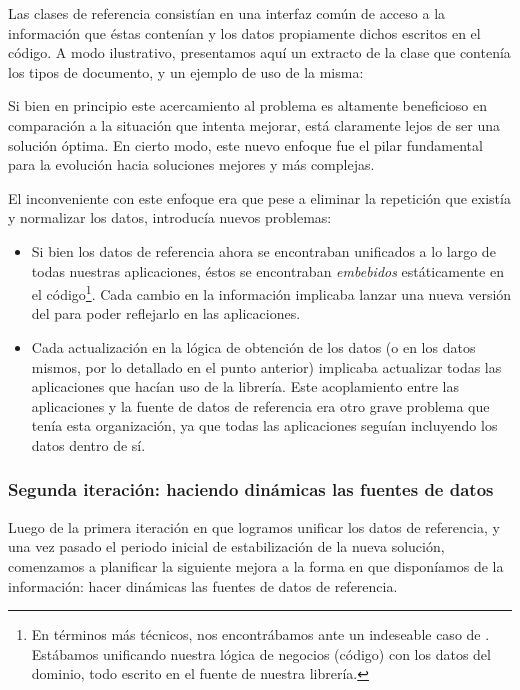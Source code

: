 Las clases de referencia consistían en una interfaz común de acceso a la información que éstas contenían y los datos propiamente dichos escritos en el código. A modo ilustrativo, presentamos aquí un extracto de la clase que contenía los tipos de documento, y un ejemplo de uso de la misma:


Si bien en principio este acercamiento al problema es altamente beneficioso en comparación a la situación que intenta mejorar, está claramente lejos de ser una solución óptima. En cierto modo, este nuevo enfoque fue el pilar fundamental para la evolución hacia soluciones mejores y más complejas.

El inconveniente con este enfoque era que pese a eliminar la repetición que existía y normalizar los datos, introducía nuevos problemas:

\begin{itemize}
  \item Si bien los datos de referencia ahora se encontraban unificados a lo largo de todas nuestras aplicaciones, éstos se encontraban \textit{embebidos} estáticamente en el código\footnote{En términos más técnicos, nos encontrábamos ante un indeseable caso de . Estábamos unificando nuestra lógica de negocios (código) con los datos del dominio, todo escrito en el fuente de nuestra librería.}. Cada cambio en la información implicaba lanzar una nueva versión del  para poder reflejarlo en las aplicaciones.

  \item Cada actualización en la lógica de obtención de los datos (o en los datos mismos, por lo detallado en el punto anterior) implicaba actualizar todas las aplicaciones que hacían uso de la librería. Este acoplamiento entre las aplicaciones y la fuente de datos de referencia era otro grave problema que tenía esta organización, ya que todas las aplicaciones seguían incluyendo los datos dentro de sí.
\end{itemize}


\subsubsection{Segunda iteración: haciendo dinámicas las fuentes de datos}
\label{nube:etapa2}

Luego de la primera iteración en que logramos unificar los datos de referencia, y una vez pasado el periodo inicial de estabilización de la nueva solución, comenzamos a planificar la siguiente mejora a la forma en que disponíamos de la información: hacer dinámicas las fuentes de datos de referencia.

